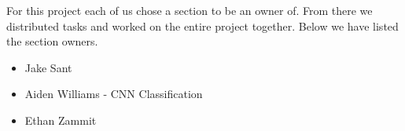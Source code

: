 For this project each of us chose a section to be an owner of.
From there we distributed tasks and worked on the entire project together.
Below we have listed the section owners.

\begin{itemize}

    \item Jake Sant

    \item Aiden Williams - CNN Classification

    \item Ethan Zammit

\end{itemize}